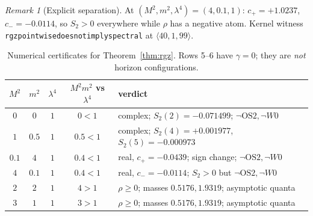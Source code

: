 \documentclass[11pt,a4paper]{article}
\theoremstyle{plain}
\theoremstyle{definition}
\theoremstyle{remark}
\newtheorem{remark}[theorem]{Remark}
\newcommand{\OS}{\mathrm{OS}}\newcommand{\Gap}{\mathrm{Gap}}
\renewcommand{\_}{\oldunderscore\allowbreak}
\newcommand{\Lean}[1]{\texttt{\small #1}}
\begin{document}
\begin{remark}[Explicit separation]\label{rem:pointwise}
At $(M^2,m^2,\lambda^4)=(4,0.1,1)$: $c_+=+1.0237$, $c_-=-0.0114$, so $S_2>0$ everywhere while
$\rho$ has a negative atom. Kernel witness
\Lean{rgz\_pointwise\_does\_not\_imply\_spectral} at $\langle40,1,99\rangle$.
\end{remark}
\begin{table}[htbp]\centering\small
\renewcommand{\arraystretch}{1.2}
\begin{tabular}{ccccl}
\toprule
$M^2$ & $m^2$ & $\lambda^4$ & $M^2m^2$ vs $\lambda^4$ & verdict\\
\midrule
$0$ & $0$ & $1$ & $0<1$ & complex; $S_2(2)=-0.071499$; $\neg\OS2,\neg W0$\\
$1$ & $0.5$ & $1$ & $0.5<1$ & complex; $S_2(4)=+0.001977$, $S_2(5)=-0.000973$\\
$0.1$ & $4$ & $1$ & $0.4<1$ & real, $c_+=-0.0439$; sign change; $\neg\OS2,\neg W0$\\
$4$ & $0.1$ & $1$ & $0.4<1$ & real, $c_-=-0.0114$; $S_2>0$ but $\neg\OS2,\neg W0$\\
$2$ & $2$ & $1$ & $4>1$ & $\rho\ge0$; masses $0.5176,1.9319$; asymptotic quanta\\
$3$ & $1$ & $1$ & $3>1$ & $\rho\ge0$; masses $0.5176,1.9319$; asymptotic quanta\\
\bottomrule
\end{tabular}
\caption{Numerical certificates for Theorem~\ref{thm:rgz}. Rows 5--6 have $\gamma=0$; they are
\emph{not} horizon configurations.}
\label{tab:rgz}
\end{table}
\end{document}
